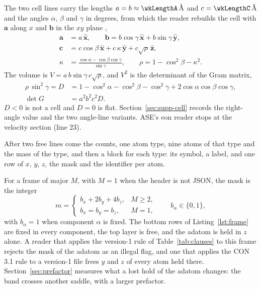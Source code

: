 The two cell lines carry the lengths
\(a=b\approx\wkLengthA\,\text{\AA}\) and \(c=\wkLengthC\,\text{\AA}\)
and the angles \(\alpha\), \(\beta\) and \(\gamma\) in degrees, from
which the reader rebuilds the cell with \(\mathbf{a}\) along \(x\) and
\(\mathbf{b}\) in the \(xy\) plane
\cite{bekkerUnificationBoxShapes1997},
\begin{equation}
\label{eq:cell}
\begin{aligned}
\mathbf{a}&=a\,\hat{\mathbf{x}},\qquad
\mathbf{b}=b\cos\gamma\,\hat{\mathbf{x}}+b\sin\gamma\,\hat{\mathbf{y}},\\
\mathbf{c}&=c\cos\beta\,\hat{\mathbf{x}}+c\,\kappa\,\hat{\mathbf{y}}+c\sqrt{\rho}\,\hat{\mathbf{z}},\\
\kappa&=\frac{\cos\alpha-\cos\beta\cos\gamma}{\sin\gamma},\qquad \rho=1-\cos^2\beta-\kappa^2.
\end{aligned}
\end{equation}
The volume is \(V=a\,b\sin\gamma\,c\sqrt{\rho}\), and \(V^2\) is the determinant of the Gram matrix,
\begin{equation}
\label{eq:gram}
\begin{aligned}
\rho\,\sin^2\gamma = D &= 1-\cos^2\alpha-\cos^2\beta-\cos^2\gamma+2\cos\alpha\cos\beta\cos\gamma,\\
\det G &= a^2b^2c^2D .
\end{aligned}
\end{equation}
\(D<0\) is not a cell and \(D=0\) is flat.
Section~\ref{sec:supp-cell} records the right-angle value and the two angle-line variants.
ASE's eon reader stops at the velocity section (line 23).

After two free lines come the counts, one atom type, nine atoms of that
type and the mass of the type, and then a block for each type: its
symbol, a label, and one row of \(x\), \(y\), \(z\), the mask and the
identifier per atom.

For a frame of major \(M\), with \(M=1\) when the header is not JSON,
the mask is the integer
\begin{equation}
\label{eq:mask}
m =
\begin{cases}
b_x + 2 b_y + 4 b_z, & M\ge 2,\\
b_x = b_y = b_z, & M = 1,
\end{cases}
\qquad b_\alpha\in\{0,1\},
\end{equation}
with \(b_\alpha=1\) when component \(\alpha\) is fixed.
The bottom rows of Listing~\ref{lst:frame} are fixed in every component,
the top layer is free, and the adatom is held in \(z\) alone.
A reader that applies the version-1 rule of Table~\ref{tab:clauses} to
this frame rejects the mask of the adatom as an illegal flag, and one
that applies the CON 3.1 rule to a version-1 file frees \(y\) and \(z\)
of every atom held there.
Section~\ref{sec:prefactor} measures what a lost hold of the adatom
changes: the band crosses another saddle, with a larger prefactor.

